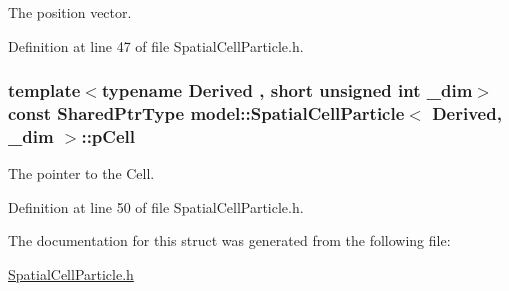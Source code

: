 The position vector. 



Definition at line 47 of file Spatial\+Cell\+Particle.\+h.

\hypertarget{structmodel_1_1_spatial_cell_particle_aeb09c09a5ce9ce6d4d849dd1d7232aa4}{}
\subsubsection[{p\+Cell}]{\setlength{\rightskip}{0pt plus 5cm}template$<$typename Derived , short unsigned int \+\_\+dim$>$ const {\bf Shared\+Ptr\+Type} {\bf model\+::\+Spatial\+Cell\+Particle}$<$ Derived, \+\_\+dim $>$\+::p\+Cell}\label{structmodel_1_1_spatial_cell_particle_aeb09c09a5ce9ce6d4d849dd1d7232aa4}


The pointer to the Cell. 



Definition at line 50 of file Spatial\+Cell\+Particle.\+h.



The documentation for this struct was generated from the following file\+:\begin{DoxyCompactItemize}
\item 
\hyperlink{_spatial_cell_particle_8h}{Spatial\+Cell\+Particle.\+h}\end{DoxyCompactItemize}
